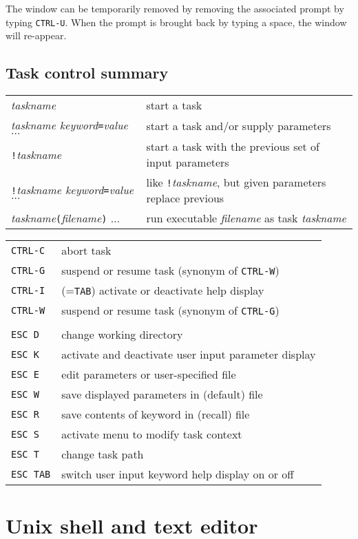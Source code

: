 The window can be temporarily removed by removing the associated prompt by
typing {\tt CTRL-U}. When the prompt is brought back by typing a space, the
window will re-appear.

\subsection*{Task control summary}
\begin{tabular}{ll}
{\it taskname}&start a task\\
{\it taskname
keyword\/{\tt =}value\/ $\ldots$}&start a task and/or supply parameters\\
{\tt !}{\it taskname}&start a task with the previous set of input parameters\\
{\tt !}{\it taskname
keyword\/{\tt =}value\/ $\ldots$}&like {\tt !}{\it taskname\/}, but given
parameters replace previous\\
{\it taskname}{\tt (}{\it filename\/}{\tt )} $\ldots$&
run executable {\it filename\/} as task {\it taskname}\\
\end{tabular}

\begin{tabular}{ll}
{\tt CTRL-C}&abort task\\
{\tt CTRL-G}&suspend or resume task (synonym of {\tt  CTRL-W})\\
{\tt CTRL-I}&(={\tt TAB}) activate or deactivate help display\\
{\tt CTRL-W}&suspend or resume task (synonym of {\tt  CTRL-G})\\
\\
{\tt ESC D}&change working directory\\
{\tt ESC K}&activate and deactivate user input parameter display\\
{\tt ESC E}&edit parameters or user-specified file\\
{\tt ESC W}&save displayed parameters in (default) file\\
{\tt ESC R}&save contents of keyword in (recall) file\\
{\tt ESC S}&activate menu to modify task context\\
{\tt ESC T}&change task path\\
{\tt ESC TAB}&switch user input keyword help display on or off\\
\end{tabular}
\section{Unix shell and text editor}
